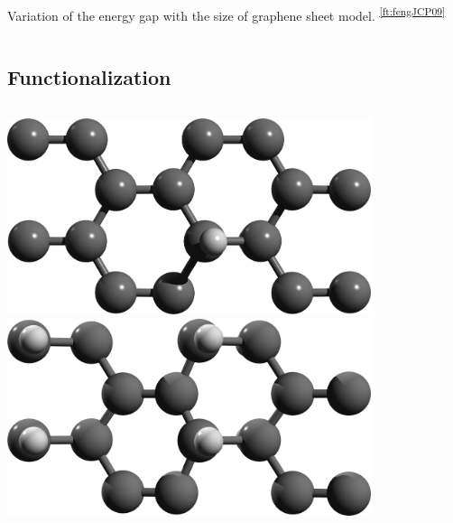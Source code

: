 \documentclass{beamer}
\begin{document}
\begin{frame}
\begin{columns}
\begin{center}
{\footnotesize Variation of the energy gap with the size of graphene sheet
model.\textsuperscript{ \ref{ft:fengJCP09}}}
\end{center}
    
\end{columns}
\end{frame}




\subsection{Functionalization}

\begin{frame}

\begin{columns}


\begin{center}
\includegraphics[width=0.8\textwidth]{figs/row.png}\\

\vspace{7mm}
\includegraphics[width=0.8\textwidth]{figs/alt1.png}\\



\end{center}
\end{columns}
\end{frame}
\end{document}

